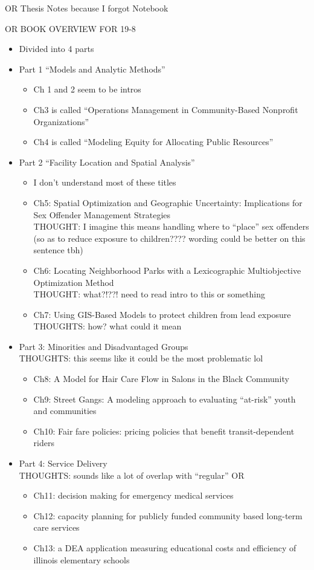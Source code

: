 \documentclass{article}
\begin{document}
{\huge OR Thesis Notes because I forgot Notebook


OR BOOK OVERVIEW FOR 19-8}
\begin{itemize}
\item Divided into 4 parts
\item Part 1 ``Models and Analytic Methods''
	\begin{itemize}
	\item Ch 1 and 2 seem to be intros
    \item Ch3 is called ``Operations Management in Community-Based Nonprofit Organizations''
    \item Ch4 is called ``Modeling Equity for Allocating Public Resources''
	\end{itemize}
\item Part 2 ``Facility Location and Spatial Analysis''
	\begin{itemize}
	\item I don't understand most of these titles
    \item Ch5: Spatial Optimization and Geographic Uncertainty: Implications for Sex Offender Management Strategies \\ THOUGHT: I imagine this means handling where to ``place'' sex offenders (so as to reduce exposure to children???? wording could be better on this sentence tbh)
    \item Ch6: Locating Neighborhood Parks with a Lexicographic Multiobjective Optimization Method \\ THOUGHT: what?!??! need to read intro to this or something
    \item Ch7: Using GIS-Based Models to protect children from lead exposure \\ THOUGHTS: how? what could it mean
    \end{itemize}
\item Part 3: Minorities and Disadvantaged Groups \\ THOUGHTS: this seems like it could be the most problematic lol
    \begin{itemize}
    \item Ch8: A Model for Hair Care Flow in Salons in the Black Community
    \item Ch9: Street Gangs: A modeling approach to evaluating ``at-risk'' youth and communities
    \item Ch10: Fair fare policies: pricing policies that benefit transit-dependent riders
	\end{itemize}
\item Part 4: Service Delivery \\ THOUGHTS: sounds like a lot of overlap with ``regular'' OR
 	\begin{itemize}
	\item Ch11: decision making for emergency medical services
    \item Ch12: capacity planning for publicly funded community based long-term care services
    \item Ch13: a DEA application measuring educational costs and efficiency of illinois elementary schools
	\end{itemize}
\end{itemize}
\end{document}
